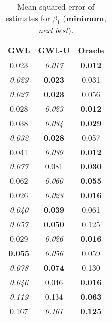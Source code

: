 \documentclass[authoryear, review, 11pt]{elsarticle}
\begin{document}
\begin{table}[ht]
\begin{center}
\begin{tabular}{ccc}
 GWL & GWL-U & Oracle \\ 
  \hline
0.023 & \emph{0.017} & \textbf{0.012} \\ 
  \emph{0.029} & \textbf{0.023} & 0.031 \\ 
  \emph{0.027} & \textbf{0.023} & 0.056 \\ 
  0.028 & \emph{0.023} & \textbf{0.012} \\ 
  0.038 & \emph{0.034} & \textbf{0.029} \\ 
  \emph{0.032} & \textbf{0.028} & 0.057 \\ 
  0.041 & \emph{0.039} & \textbf{0.012} \\ 
  \emph{0.077} & 0.081 & \textbf{0.030} \\ 
  0.062 & \emph{0.060} & \textbf{0.055} \\ 
  0.026 & \emph{0.023} & \textbf{0.016} \\ 
  \emph{0.040} & \textbf{0.039} & 0.061 \\ 
  \emph{0.057} & \textbf{0.050} & 0.125 \\ 
  0.029 & \emph{0.026} & \textbf{0.016} \\ 
  \textbf{0.055} & \emph{0.056} & 0.059 \\ 
  \emph{0.078} & \textbf{0.074} & 0.130 \\ 
  \emph{0.046} & 0.046 & \textbf{0.016} \\ 
  \emph{0.119} & 0.134 & \textbf{0.063} \\ 
  0.167 & \emph{0.161} & \textbf{0.125} \\ 
  \end{tabular}
\caption{Mean squared error of estimates for $\beta_1$ (\textbf{minimum}, \emph{next best}).\label{MSEX}}
\end{center}
\end{table}
\end{document}
